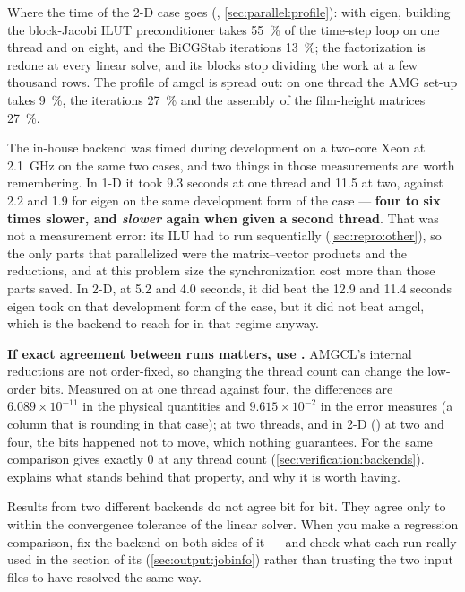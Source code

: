 Where the time of the 2-D case goes (,
\cref{sec:parallel:profile}): with eigen, building the block-Jacobi ILUT
preconditioner takes \SI{55}{\percent} of the time-step loop on one thread and
on eight, and the BiCGStab iterations \SI{13}{\percent}; the factorization is
redone at every linear solve, and its blocks stop dividing the work at a few
thousand rows. The profile of amgcl is spread out: on one thread the AMG
set-up takes \SI{9}{\percent}, the iterations \SI{27}{\percent} and the
assembly of the film-height matrices \SI{27}{\percent}.

The in-house backend was timed during development on a two-core Xeon at
\SI{2.1}{\giga\hertz} on the same two cases, and two things in those measurements are worth
remembering. In 1-D it took 9.3 seconds at one thread and 11.5 at two, against
2.2 and 1.9 for eigen on the same development form of the case --- \textbf{four
to six times slower, and \emph{slower} again when given a second thread}. That was not a measurement error: its ILU
had to run sequentially (\cref{sec:repro:other}), so the only parts that
parallelized were the matrix--vector products and the reductions, and at this
problem size the synchronization cost more than those parts saved. In 2-D, at
5.2 and 4.0 seconds, it did beat the 12.9 and 11.4 seconds eigen took on
that development form of the case, but it did not beat amgcl, which is the
backend to reach for in that regime anyway.

\textbf{If exact agreement between runs matters, use .}
AMGCL's internal reductions are not order-fixed, so changing
the thread count can change the low-order bits. Measured on  at
one thread against four, the differences are $6.089\times10^{-11}$ in the
physical quantities and $9.615\times10^{-2}$ in the error measures (a column
that is rounding in that case); at two threads, and in 2-D
() at two and four, the bits happened not to move,
which nothing guarantees. For  the same comparison gives exactly
$0$ at any thread count (\cref{sec:verification:backends}).  explains what
stands behind that property, and why it is worth having.

\begin{warn}
  Results from two different backends do not agree bit for bit. They agree only
  to within the convergence tolerance of the linear solver. When you make a
  regression comparison, fix the backend on both sides of it --- and check what
  each run really used in the  section of its
   (\cref{sec:output:jobinfo}) rather than trusting the two
  input files to have resolved  the same way.
\end{warn}

